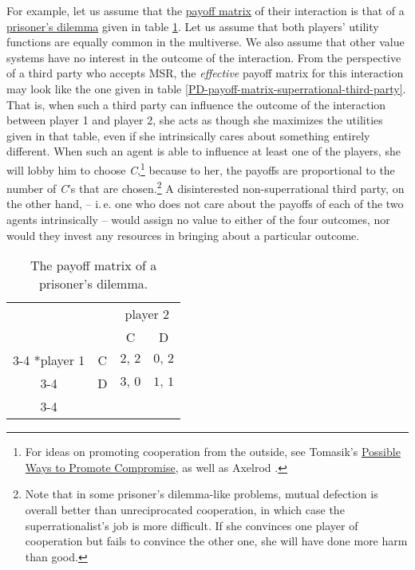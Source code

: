 For example, let us assume that the
\href{https://en.wikipedia.org/wiki/Normal-form_game}{payoff
matrix} of their interaction is that of a
\href{https://en.wikipedia.org/wiki/Prisoner\%27s_dilemma}{prisoner's
dilemma} given in table \ref{PD-payoff-matrix}. Let us
assume that both players' utility functions are equally common in the
multiverse. We also assume that other value systems have no interest in
the outcome of the interaction. From the perspective of a third party
who accepts MSR, the \emph{effective} payoff matrix for this interaction
may look like the one given in table
\ref{PD-payoff-matrix-superrational-third-party}. That
is, when such a third party can influence the outcome of the interaction
between player 1 and player 2, she acts as though she maximizes the
utilities given in that table, even if she intrinsically cares about
something entirely different. When such an agent is able to influence at
least one of the players, she will lobby him to choose
\emph{C},\footnote{For ideas on promoting cooperation from the outside,
  see Tomasik's
  \href{https://foundational-research.org/possible-ways-to-promote-compromise/}{Possible
  Ways to Promote Compromise}, as well as Axelrod \citeyear{Axelrod2006-ci}.} because to her, the payoffs
are proportional to the number of \emph{C}'s that are chosen.\footnote{Note
  that in some prisoner's dilemma-like problems, mutual defection is
  overall better than unreciprocated cooperation, in which case the
  superrationalist's job is more difficult. If she convinces one player
  of cooperation but fails to convince the other one, she will have done
  more harm than good.} A disinterested non-superrational third party,
on the other hand, -- i.\,e. one who does not care about the payoffs of
each of the two agents intrinsically -- would assign no value to either
of the four outcomes, nor would they invest any resources in bringing
about a particular outcome.

\renewcommand{\arraystretch}{1.5}
\begin{table}[h!]
    \centering
    \setlength{\extrarowheight}{2pt}
    \begin{tabular}{cc|c|c|}
      & \multicolumn{1}{c}{} & \multicolumn{2}{c}{player 2}\\
      & \multicolumn{1}{c}{} & \multicolumn{1}{c}{C}  & \multicolumn{1}{c}{D} \\\cline{3-4}
      \multirow{2}*{player 1}  & C & $2,\, 2$ & $0,\, 2$ \\\cline{3-4}
      & D & $3,\, 0$ & $1,\, 1$ \\\cline{3-4}
    \end{tabular}
    \caption{The payoff matrix of a prisoner's dilemma.}
    \label{PD-payoff-matrix}
\end{table}

